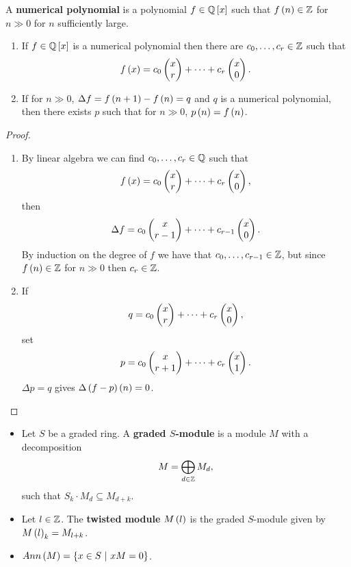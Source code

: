 \begin{definition}
A \textbf{numerical polynomial} is a polynomial $ f \in \QQ\sbr{x} $ such that $ f\br{n} \in \ZZ $ for $ n \gg 0 $ for $ n $ sufficiently large.
\end{definition}

\begin{theorem}
\hfill
\begin{enumerate}
\item If $ f \in \QQ\sbr{x} $ is a numerical polynomial then there are $ c_0, \dots, c_r \in \mathbb{Z} $ such that
$$ f\br{x} = c_0\twobyone{x}{r} + \dots + c_r\twobyone{x}{0}. $$
\item If for $ n \gg 0 $, $ \Delta f = f\br{n + 1} - f\br{n} = q $ and $ q $ is a numerical polynomial, then there exists $ p $ such that for $ n \gg 0 $, $ p\br{n} = f\br{n} $.
\end{enumerate}
\end{theorem}

\begin{proof}
\hfill
\begin{enumerate}
\item By linear algebra we can find $ c_0, \dots, c_r \in \mathbb{Q} $ such that
$$ f\br{x} = c_0\twobyone{x}{r} + \dots + c_r\twobyone{x}{0}, $$
then
$$ \Delta f = c_0\begin{pmatrix} x \\ r - 1 \end{pmatrix} + \dots + c_{r - 1}\begin{pmatrix} x \\ 0 \end{pmatrix}. $$
By induction on the degree of $ f $ we have that $ c_0, \dots, c_{r - 1} \in \mathbb{Z} $, but since $ f\br{n} \in \ZZ $ for $ n \gg 0 $ then $ c_r \in \mathbb{Z} $.
\item If
$$ q = c_0\begin{pmatrix} x \\ r \end{pmatrix} + \dots + c_r\begin{pmatrix} x \\ 0 \end{pmatrix}, $$
set
$$ p = c_0\begin{pmatrix} x \\ r + 1 \end{pmatrix} + \dots + c_r\begin{pmatrix} x \\ 1 \end{pmatrix}. $$
$ \Delta p = q $ gives $ \Delta \br{f - p}\br{n} = 0 $.
\end{enumerate}
\end{proof}

\pagebreak

\begin{definition}
\hfill
\begin{itemize}
\item Let $ S $ be a graded ring. A \textbf{graded $ S $-module} is a module $ M $ with a decomposition
$$ M = \bigoplus_{d \in \mathbb{Z}} M_d, $$
such that $ S_k \cdot M_d \subseteq M_{d + k} $.
\item Let $ l \in \mathbb{Z} $. The \textbf{twisted module} $ M\br{l} $ is the graded $ S $-module given by $ M\br{l}_k = M_{l + k} $.
\item $ Ann\br{M} = \cbr{x \in S \st xM = 0} $.
\end{itemize}
\end{definition}

